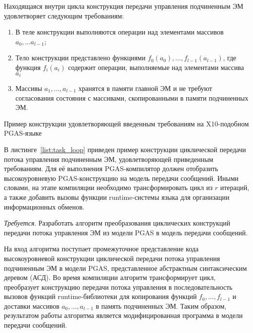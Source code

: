 Находящаяся внутри цикла конструкция передачи управления подчиненным ЭМ удовлетворяет следующим требованиям:
\begin{enumerate}
\item В теле конструкции выполняются операции над элементами массивов $a_{0},...a_{l-1}$;
\item Тело конструкции представлено функциями $f_{0}(a_{0}), ..., f_{l-1}(a_{l-1})$, где функция $f_{i}(a_{i})$ содержит операции, выполняемые над элементами массива $a_{i}$
\item Массивы $a_{1}, ..., a_{l-1}$ хранятся в памяти главной ЭМ и не требуют согласования состояния с массивами, скопированными в памяти подчиненных ЭМ.
\end{enumerate}

\begin{ListingEnv}[!h]
  
    \caption{Пример конструкции удовлетворяющей введенным требованиям на X10-подобном PGAS-языке}
    \label{list:task_loop}
\end{ListingEnv}

В листинге~\ref{list:task_loop} приведен пример конструкции циклической передачи потока управления подчиненным ЭМ, удовлетворяющей приведенным требованиям. Для её выполнения PGAS-компилятор должен отобразить высокоуровневую PGAS-конструкцию на модель передачи сообщений. Иными словами, на этапе компиляции необходимо трансформировать цикл из $r$ итераций, а также добавить вызовы функции runtime-системы языка для организации информационных обменов.

\textit{Требуется}. Разработать алгоритм преобразования циклических конструкций передачи потока управления ЭМ из модели PGAS в модель передачи сообщений.

На вход алгоритма поступает промежуточное представление кода высокоуровневой конструкции циклической передачи потока управления подчиненным ЭМ в модели PGAS, представленное абстрактным синтаксическим деревом (АСД). Во время компиляции алгоритм трансформирует цикл, преобразует конструкцию передачи потока управления в последовательность вызовов функций runtime-библиотеки для копирования функций $f_{0},...,f_{l-1}$ и доставки массивов $a_{0},...,a_{l-1}$ в память подчиненных ЭМ. Таким образом, результатом работы алгоритма является модифицированная программа в модели передачи сообщений.


